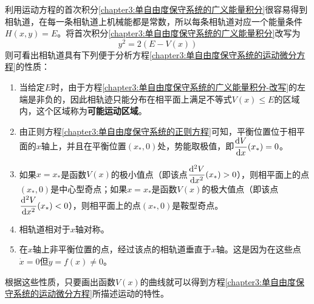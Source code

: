 利用运动方程的首次积分\eqref{chapter3:单自由度保守系统的广义能量积分}很容易得到相轨道，在每一条相轨道上机械能都是常数，所以每条相轨道对应一个能量条件$H(x,y)=E$。将首次积分\eqref{chapter3:单自由度保守系统的广义能量积分}改写为
\begin{equation}
	y^2 = 2(E-V(x))
	\label{chapter3:单自由度保守系统的广义能量积分-改写}
\end{equation}
则可看出相轨道具有下列便于分析方程\eqref{chapter3:单自由度保守系统的运动微分方程}的性质：
\begin{enumerate}
\item 当给定$E$时，由于方程\eqref{chapter3:单自由度保守系统的广义能量积分-改写}的左端是非负的，因此相轨迹只能分布在相平面上满足不等式$V(x)\leqslant E$的区域内，这个区域称为{\bf 可能运动区域}。

\item 由正则方程\eqref{chapter3:单自由度保守系统的正则方程}可知，平衡位置位于相平面的$x$轴上，并且在平衡位置$(x_*,0)$处，势能取极值，即$\dfrac{\mathrm{d} V}{\mathrm{d} x}(x_*)=0$。

\item 如果$x=x_*$是函数$V(x)$的极小值点（即该点$\dfrac{\mathrm{d}^2 V}{\mathrm{d} x^2}(x_*)>0$），则相平面上的点$(x_*,0)$是中心型奇点；如果$x=x_*$是函数$V(x)$的极大值点（即该点$\dfrac{\mathrm{d}^2 V}{\mathrm{d} x^2}(x_*)<0$），则相平面上的点$(x_*,0)$是鞍型奇点。

\item 相轨道相对于$x$轴对称。

\item 在$x$轴上非平衡位置的点，经过该点的相轨道垂直于$x$轴。这是因为在这些点$\dot{x}=0$但$\dot{y}=f(x)\neq 0$。
\end{enumerate}

根据这些性质，只要画出函数$V(x)$的曲线就可以得到方程\eqref{chapter3:单自由度保守系统的运动微分方程}所描述运动的特性。


